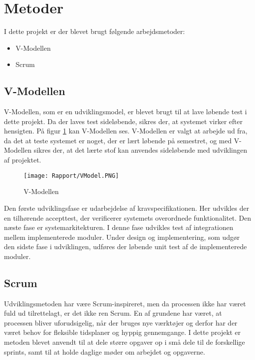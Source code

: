 \section{Metoder}

I dette projekt er der blevet brugt følgende arbejdsmetoder:
\begin{itemize}
	\item V-Modellen
	\item Scrum
	
\end{itemize}

\subsection{V-Modellen}

V-Modellen, som er en udviklingsmodel, er blevet brugt til at lave løbende test i dette projekt. Da der laves test sideløbende, sikres der, at systemet virker efter hensigten. På figur \ref{VModel} kan V-Modellen ses. V-Modellen er valgt at arbejde ud fra, da det at teste systemet er noget, der er lært løbende på semestret, og med V-Modellen sikres der, at det lærte stof kan anvendes sideløbende med udviklingen af projektet. 

\begin{figure}[H]
	\centering
	\texttt{[image: Rapport/VModel.PNG]}
	\caption{V-Modellen}
	\label{VModel}
\end{figure} 
Den første udviklingsfase er udarbejdelse af kravspecifikationen. Her udvikles der en tilhørende accepttest, der verificerer systemets overordnede funktionalitet. Den næste fase er systemarkitekturen.
I denne fase udvikles test af integrationen mellem implementerede moduler. Under design og implementering, som udgør den sidste fase i udviklingen, udføres der løbende unit test af de implementerede moduler.

\subsection{Scrum}
Udviklingsmetoden har være Scrum-inspireret, men da processen ikke har været fuld ud tilrettelagt, er det ikke ren Scrum. En af grundene har været, at processen bliver uforudsigelig, når der bruges nye værktøjer og derfor har der været behov for fleksible tidsplaner og hyppig gennemgange. 
\newline
\newline
I dette projekt er metoden blevet anvendt til at dele større opgaver op i små dele til de forskellige sprints, samt til at holde daglige møder om arbejdet og opgaverne. 


